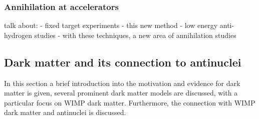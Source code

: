 \subsubsection{Annihilation at accelerators}

talk about: 
 - fixed target experiments
 - this new method
 - low energy anti-hydrogen studies
 - with these techniques, a new area of annihilation studies

\subsection{Dark matter and its connection to antinuclei}
In this section a brief introduction into the motivation and evidence for dark matter is given, several prominent dark matter models are discussed, with a particular focus on WIMP dark matter. Furthermore, the connection with WIMP dark matter and antinuclei is discussed. 
